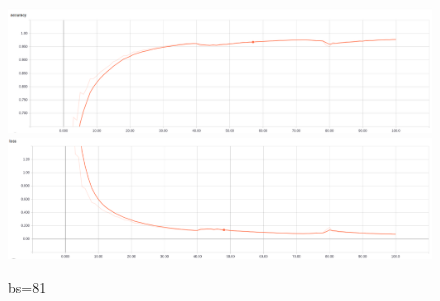 \documentclass{article}
\begin{document}
\begin{figure}[h!]
	\centering
	\caption{bs=81}
	\includegraphics[width=\textwidth]{acc_log-model_1AG-gsbb_2C1-bs81-xyz-color_1norm-2048-mat}
	\includegraphics[width=\textwidth]{loss_log-model_1AG-gsbb_2C1-bs81-xyz-color_1norm-2048-mat}
\end{figure}
\end{document}
